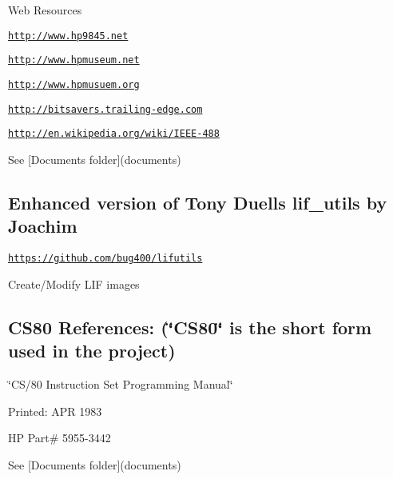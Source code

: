 \begin{DoxyItemize}
\item Web Resources
\begin{DoxyItemize}
\item \href{http://www.hp9845.net}{\tt http\+://www.\+hp9845.\+net}
\item \href{http://www.hpmuseum.net}{\tt http\+://www.\+hpmuseum.\+net}
\item \href{http://www.hpmusuem.org}{\tt http\+://www.\+hpmusuem.\+org}
\item \href{http://bitsavers.trailing-edge.com}{\tt http\+://bitsavers.\+trailing-\/edge.\+com}
\item \href{http://en.wikipedia.org/wiki/IEEE-488}{\tt http\+://en.\+wikipedia.\+org/wiki/\+I\+E\+E\+E-\/488}
\item See \mbox{[}Documents folder\mbox{]}(documents)
\end{DoxyItemize}
\end{DoxyItemize}



 \subsection*{Enhanced version of Tony Duell\textquotesingle{}s lif\+\_\+utils by Joachim}


\begin{DoxyItemize}
\item \href{https://github.com/bug400/lifutils}{\tt https\+://github.\+com/bug400/lifutils}
\item Create/\+Modify L\+IF images
\end{DoxyItemize}



 \subsection*{C\+S80 References\+: (\char`\"{}\+C\+S80\char`\"{} is the short form used in the project)}


\begin{DoxyItemize}
\item \char`\"{}\+C\+S/80 Instruction Set Programming Manual\char`\"{}
\item Printed\+: A\+PR 1983
\item HP Part\# 5955-\/3442
\item See \mbox{[}Documents folder\mbox{]}(documents)
\end{DoxyItemize}



